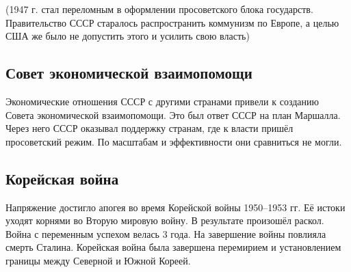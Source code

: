 (1947 г. стал переломным в оформлении просоветского блока государств. Правительство СССР старалось распространить коммунизм по Европе, а целью США же было не допустить этого и усилить свою власть)

\subsection{Совет экономической взаимопомощи}

Экономические отношения СССР с другими странами привели к созданию Совета экономической взаимопомощи. Это был ответ СССР на план Маршалла. Через него СССР оказывал поддержку странам, где к власти пришёл просоветский режим. По масштабам и эффективности они сравниться не могли.

\subsection{Корейская война}

Напряжение достигло апогея во время Корейской войны 1950--1953 гг. Её истоки уходят корнями во Вторую мировую войну. В результате произошёл раскол. Война с переменным успехом велась 3 года. На завершение войны повлияла смерть Сталина. Корейская война была завершена перемирием и установлением границы между Северной и Южной Кореей.
